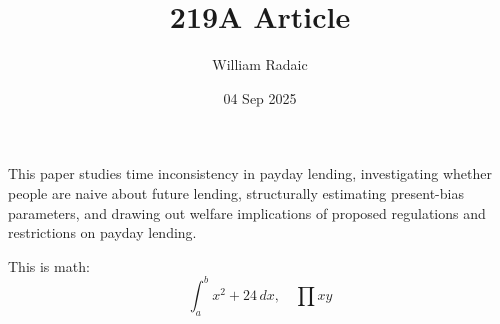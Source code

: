 \documentclass[english,12pt]{wr-article}
\title{219A Article}
\author{William Radaic}
\date{04 Sep 2025}
\begin{document}
\maketitle



This paper studies time inconsistency in payday lending, investigating whether people are naive about future lending, structurally estimating present-bias parameters, and drawing out welfare implications of proposed regulations and restrictions on payday lending.

This is math: 
\begin{equation}
    \int_{a}^{b} x^2 + 24  \,dx, \quad \prod xy 
\end{equation}


\clearpage 
\printbibliography[title={References}]
\end{document}
